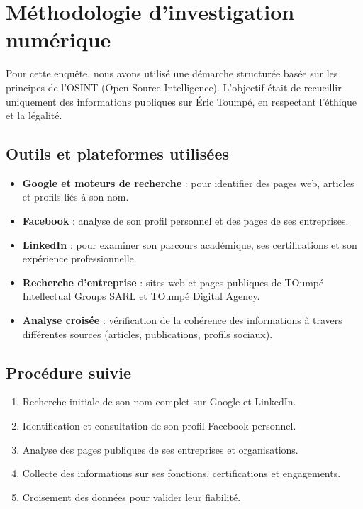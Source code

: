 \documentclass[memoire, 12pt]{report}
\begin{document}
\chapter{Méthodologie d’investigation numérique}
Pour cette enquête, nous avons utilisé une démarche structurée basée sur les principes de l’OSINT (Open Source Intelligence).  
L’objectif était de recueillir uniquement des informations publiques sur Éric Toumpé, en respectant l’éthique et la légalité.

\section{Outils et plateformes utilisées}
\begin{itemize}
    \item \textbf{Google et moteurs de recherche} : pour identifier des pages web, articles et profils liés à son nom.
    \item \textbf{Facebook} : analyse de son profil personnel et des pages de ses entreprises.
    \item \textbf{LinkedIn} : pour examiner son parcours académique, ses certifications et son expérience professionnelle.
    \item \textbf{Recherche d'entreprise} : sites web et pages publiques de TOumpé Intellectual Groups SARL et TOumpé Digital Agency.
    \item \textbf{Analyse croisée} : vérification de la cohérence des informations à travers différentes sources (articles, publications, profils sociaux).
\end{itemize}

\section{Procédure suivie}
\begin{enumerate}
    \item Recherche initiale de son nom complet sur Google et LinkedIn.
    \item Identification et consultation de son profil Facebook personnel.
    \item Analyse des pages publiques de ses entreprises et organisations.
    \item Collecte des informations sur ses fonctions, certifications et engagements.
    \item Croisement des données pour valider leur fiabilité.
\end{enumerate}
\end{document}
